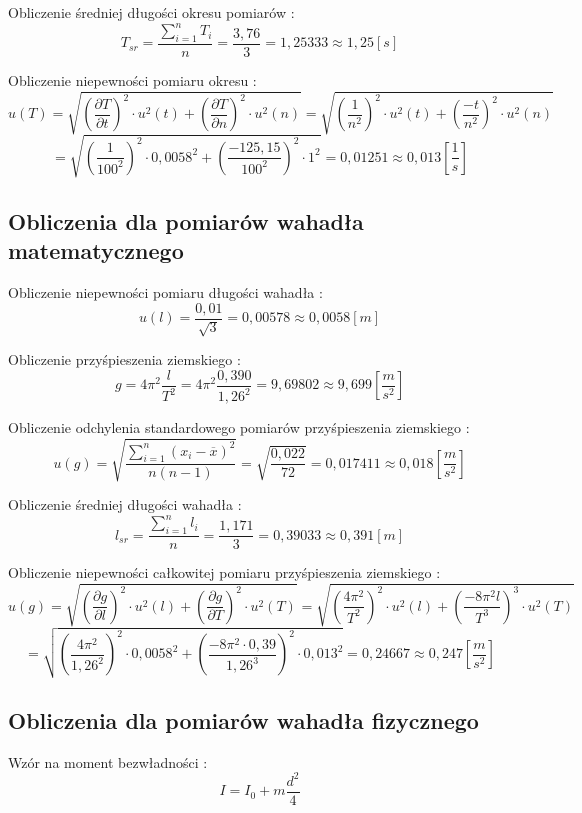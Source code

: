 \documentclass[12pt]{article}
\begin{document}
Obliczenie średniej długości okresu pomiarów :
$$ T_{sr} = \frac{\sum\limits_{i = 1}^{n} T_i}{n} = \frac{3,76}{3} = 1,25333 \approx 1,25[s] $$

Obliczenie niepewności pomiaru okresu : 
$$ u(T) = \sqrt{ \left( \frac{\partial T}{\partial t} \right)^2 \cdot u^2(t) + \left( \frac{\partial T}{\partial n} \right)^2 \cdot u^2(n) }
= \sqrt{ \left( \frac{1}{n^2} \right)^2 \cdot u^2(t) + \left( \frac{-t}{n^2} \right)^2 \cdot u^2(n) } $$
$$ = \sqrt{ \left( \frac{1}{100^2} \right)^2 \cdot 0,0058^2 + \left( \frac{-125,15}{100^2} \right)^2 \cdot 1^2 } = 0,01251 \approx 0,013 \left[ \frac{1}{s} \right]$$

\subsection{Obliczenia dla pomiarów wahadła matematycznego}

Obliczenie niepewności pomiaru długości wahadła :
$$ u(l) = \frac{0,01}{\sqrt{3}} = 0,00578 \approx 0,0058[m] $$

Obliczenie przyśpieszenia ziemskiego : 
$$ g = 4\pi^2 \frac{l}{T^2} = 4\pi^2 \frac{0,390}{1,26^2} = 9,69802 \approx 9,699 \left[ \frac{m}{s^2} \right] $$

Obliczenie odchylenia standardowego pomiarów przyśpieszenia ziemskiego :
$$ u(g) = \sqrt{ \frac{\sum\limits_{i=1}^n (x_i - \overline{x})^2}{n(n-1)} } = \sqrt{ \frac{0,022}{72} } = 0,017411 \approx 0,018 \left[\frac{m}{s^2} \right] $$ 

Obliczenie średniej długości wahadła :
$$ l_{sr} = \frac{\sum\limits_{i=1}^{n} l_i}{n} = \frac{1,171}{3} = 0,39033 \approx 0,391[m]$$

Obliczenie niepewności całkowitej pomiaru przyśpieszenia ziemskiego :
$$ u(g) = \sqrt{ \left( \frac{\partial g}{\partial l} \right)^2 \cdot u^2(l) + \left( \frac{\partial g}{\partial T} \right)^2 \cdot u^2(T) }
= \sqrt{ \left( \frac{4 \pi^2}{T^2} \right)^2 \cdot u^2(l) + \left( \frac{-8 \pi^2 l}{T^3} \right)^3 \cdot u^2(T) } $$
$$ = \sqrt{ \left( \frac{4\pi^2}{1,26^2} \right)^2 \cdot 0,0058^2 + \left( \frac{-8\pi^2 \cdot 0,39}{1,26^3} \right)^2 \cdot 0,013^2 }
= 0,24667 \approx 0,247 \left[ \frac{m}{s^2} \right] $$


\subsection{Obliczenia dla pomiarów wahadła fizycznego}

Wzór na moment bezwładności :
$$ I = I_0 + m \frac{d^2}{4} $$
\end{document}
